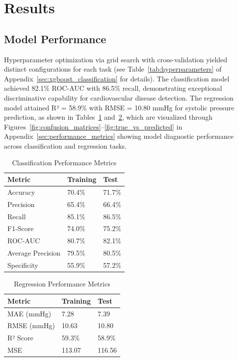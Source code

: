 \documentclass[conference]{IEEEtran}
\begin{document}
\section{Results}

\subsection{Model Performance}
Hyperparameter optimization via grid search with cross-validation yielded distinct configurations for each task (see Table~\ref{tab:hyperparameters} of Appendix~\ref{sec:xgboost_classification} for details). The classification model achieved 82.1\% ROC-AUC with 86.5\% recall, demonstrating exceptional discriminative capability for cardiovascular disease detection. The regression model attained R² = 58.9\% with RMSE = 10.80 mmHg for systolic pressure prediction, as shown in Tables~\ref{tab:classification_metrics} and~\ref{tab:regression_metrics}, which are visualized through Figures~\ref{fig:confusion_matrices}--\ref{fig:true_vs_predicted} in Appendix~\ref{sec:performance_metrics} showing model diagnostic performance across classification and regression tasks.
\begin{table}[h]
\centering
\caption{Classification Performance Metrics}
\label{tab:classification_metrics}
\begin{center}
\begin{tabular}{p{2.5cm}p{2cm}p{2cm}}
\toprule
\textbf{Metric} & \textbf{Training} & \textbf{Test} \\
\midrule
Accuracy & 70.4\% & 71.7\% \\
Precision & 65.4\% & 66.4\% \\
Recall & 85.1\% & 86.5\% \\
F1-Score & 74.0\% & 75.2\% \\
ROC-AUC & 80.7\% & 82.1\% \\
Average Precision & 79.5\% & 80.5\% \\
Specificity & 55.9\% & 57.2\% \\
\bottomrule
\end{tabular}
\end{center}
\end{table}

\begin{table}[h]
\centering
\caption{Regression Performance Metrics}
\label{tab:regression_metrics}
\begin{center}
\begin{tabular}{p{3cm}p{2cm}p{2cm}}
\toprule
\textbf{Metric} & \textbf{Training} & \textbf{Test} \\
\midrule
MAE (mmHg) & 7.28 & 7.39 \\
RMSE (mmHg) & 10.63 & 10.80 \\
R² Score & 59.3\% & 58.9\% \\
MSE & 113.07 & 116.56 \\
\bottomrule
\end{tabular}
\end{center}
\end{table}
\end{document}
